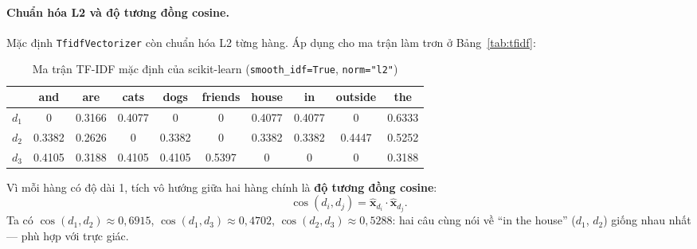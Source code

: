 

\paragraph{Chuẩn hóa L2 và độ tương đồng cosine.} Mặc định \texttt{TfidfVectorizer} còn chuẩn hóa L2 từng hàng. Áp dụng cho ma trận làm trơn ở Bảng~\ref{tab:tfidf}:

\begin{table}[H]
\centering
\small
\begin{tabular}{|l|c|c|c|c|c|c|c|c|c|}
\hline
 & and & are & cats & dogs & friends & house & in & outside & the \\
\hline
$d_1$ & 0 & 0.3166 & 0.4077 & 0 & 0 & 0.4077 & 0.4077 & 0 & 0.6333 \\ \hline
$d_2$ & 0.3382 & 0.2626 & 0 & 0.3382 & 0 & 0.3382 & 0.3382 & 0.4447 & 0.5252 \\ \hline
$d_3$ & 0.4105 & 0.3188 & 0.4105 & 0.4105 & 0.5397 & 0 & 0 & 0 & 0.3188 \\ \hline
\end{tabular}
\caption{Ma trận TF-IDF mặc định của scikit-learn (\texttt{smooth\_idf=True}, \texttt{norm="l2"})}
\label{tab:tfidf-l2}
\end{table}

Vì mỗi hàng có độ dài 1, tích vô hướng giữa hai hàng chính là \textbf{độ tương đồng cosine}:
\begin{equation}
    \cos(d_i, d_j) = \hat{\mathbf{x}}_{d_i} \cdot \hat{\mathbf{x}}_{d_j}.
\end{equation}
Ta có $\cos(d_1, d_2) \approx 0{,}6915$, $\cos(d_1, d_3) \approx 0{,}4702$, $\cos(d_2, d_3) \approx 0{,}5288$: hai câu cùng nói về ``in the house'' ($d_1$, $d_2$) giống nhau nhất --- phù hợp với trực giác.


